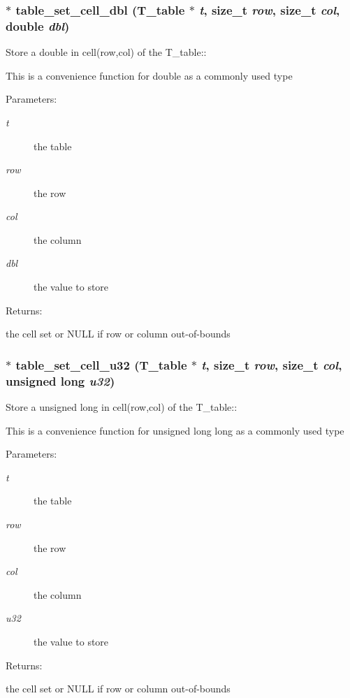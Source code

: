 \subsubsection{$\ast$ table\_\-set\_\-cell\_\-dbl ({\bf T\_\-table} $\ast$ {\em t}, size\_\-t {\em row}, size\_\-t {\em col}, double {\em dbl})}\label{table_8h_a32}


Store a double in cell(row,col) of the T\_\-table::

This is a convenience function for double as a commonly used type\begin{Desc}
\item[Parameters: ]\par
\begin{description}
\item[{\em 
t}]the table \item[{\em 
row}]the row \item[{\em 
col}]the column \item[{\em 
dbl}]the value to store\end{description}
\end{Desc}
\begin{Desc}
\item[Returns: ]\par
the cell set or NULL if row or column out-of-bounds \end{Desc}
\subsubsection{$\ast$ table\_\-set\_\-cell\_\-u32 ({\bf T\_\-table} $\ast$ {\em t}, size\_\-t {\em row}, size\_\-t {\em col}, unsigned long {\em u32})}\label{table_8h_a34}


Store a unsigned long in cell(row,col) of the T\_\-table::

This is a convenience function for unsigned long long as a commonly used type\begin{Desc}
\item[Parameters: ]\par
\begin{description}
\item[{\em 
t}]the table \item[{\em 
row}]the row \item[{\em 
col}]the column \item[{\em 
u32}]the value to store\end{description}
\end{Desc}
\begin{Desc}
\item[Returns: ]\par
the cell set or NULL if row or column out-of-bounds \end{Desc}
